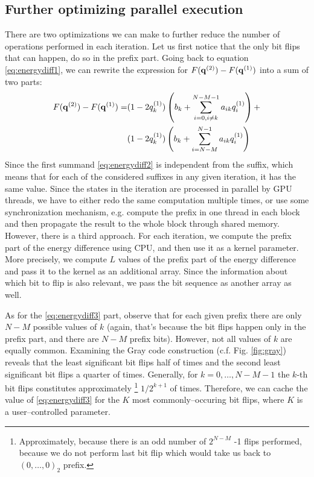 \subsection{Further optimizing parallel execution}

There are two optimizations we can make to further reduce the number of
operations performed in each iteration. Let us first notice that the only bit
flips that can happen, do so in the prefix part. Going back to equation
\eqref{eq:energydiff1}, we can rewrite the expression for $F(\mathbf{q}^{(2)})-F(\mathbf{q}^{(1)})$
into a sum of two parts:
\begin{align}
  F(\mathbf{q}^{(2)})-F(\mathbf{q}^{(1)}) = & (1-2q^{(1)}_{k}) \left(b_{k} + \sum_{i=0,i\ne k}^{N-M-1}a_{ik}q^{(1)}_{i}\right) + \label{eq:energydiff2} \\
                        & (1-2q^{(1)}_{k}) \left(b_{k} + \sum_{i=N-M}^{N-1}a_{ik}q^{(1)}_{i}\right)\label{eq:energydiff3}
\end{align}
Since the first summand \eqref{eq:energydiff2} is independent from the suffix,
which means that for each of the considered suffixes in any given iteration, it
has the same value. Since the states in the iteration are processed in parallel
by GPU threads, we have to either redo the same computation multiple times, or
use some synchronization mechanism, e.g. compute the prefix in one thread in
each block and then propagate the result to the whole block through shared
memory. However, there is a third approach. For each iteration, we compute the
prefix part of the energy difference using CPU, and then use it as a kernel
parameter. More precisely, we compute $L$ values of the prefix part of the
energy difference and pass it to the kernel as an additional array. Since the
information about which bit to flip is also relevant, we pass the bit sequence
as another array as well.

As for the \eqref{eq:energydiff3} part, observe that for each given prefix
there are only $N-M$ possible values of $k$ (again, that's because the bit
flips happen only in the prefix part, and there are $N-M$ prefix bits).
However, not all values of $k$ are equally common. Examining the Gray code
construction (c.f. Fig. \ref{fig:gray}) reveals that the least significant bit
flips half of times and the second least significant bit flips a quarter of
times. Generally, for $k=0,\ldots,N-M-1$ the $k$-th bit flips constitutes
approximately \footnote{Approximately, because there is an odd number of
$2^{N-M}$ -1 flips performed, because we do not perform last bit flip which
    would take us back to $(0,\ldots,0)_2$ prefix.} $1/2^{k+1}$ of times.
Therefore, we can cache the value of \eqref{eq:energydiff3} for the $K$ most
commonly--occuring bit flips, where $K$ is a user--controlled parameter.

